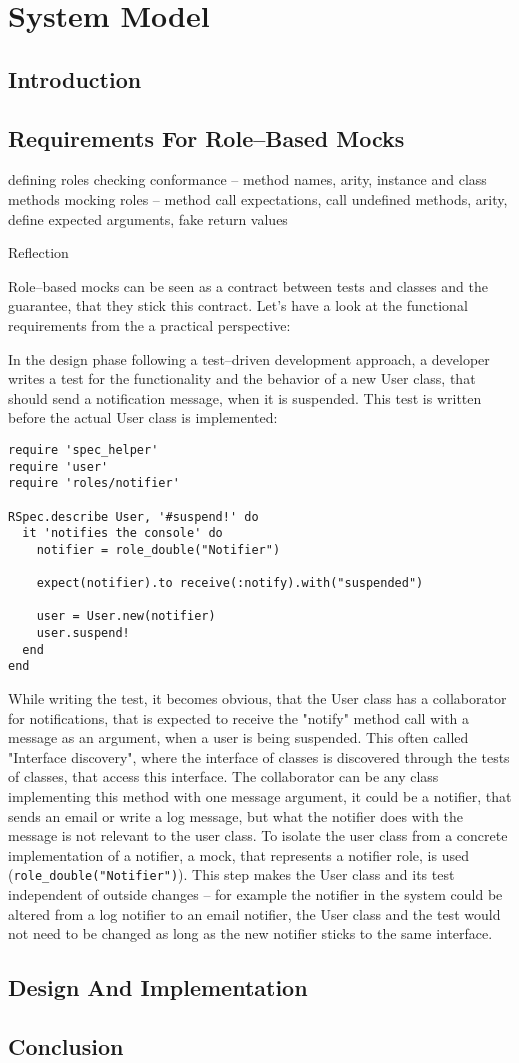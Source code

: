 \chapter{System Model}

\section{Introduction}

\section{Requirements For Role--Based Mocks}
defining roles
checking conformance – method names, arity, instance and class methods
mocking roles – method call expectations, call undefined methods, arity, define expected arguments, fake return values

Reflection

Role–based mocks can be seen as a contract between tests and classes and the guarantee, that they stick this contract. Let's have a look at the functional requirements from the a practical perspective:

In the design phase following a test–driven development approach, a developer writes a test for the functionality and the behavior of a new User class, that should send a notification message, when it is suspended. This test is written before the actual User class is implemented:

\begin{lstlisting}[caption=An example Rspec test using a double]
require 'spec_helper'
require 'user'
require 'roles/notifier'

RSpec.describe User, '#suspend!' do
  it 'notifies the console' do
    notifier = role_double("Notifier")

    expect(notifier).to receive(:notify).with("suspended")

    user = User.new(notifier)
    user.suspend!
  end
end
\end{lstlisting}

While writing the test, it becomes obvious, that the User class has a collaborator for notifications, that is expected to receive the "notify" method call with a message as an argument, when a user is being suspended. This often called "Interface discovery", where the interface of classes is discovered through the tests of classes, that access this interface. The collaborator can be any class implementing this method with one message argument, it could be a notifier, that sends an email or write a log message, but what the notifier does with the message is not relevant to the user class. To isolate the user class from a concrete implementation of a notifier, a mock, that represents a notifier role, is used (\texttt{role\_double("Notifier")}). This step makes the User class and its test independent of outside changes – for example the notifier in the system could be altered from a log notifier to an email notifier, the User class and the test would not need to be changed as long as the new notifier sticks to the same interface.


\section{Design And Implementation}

\section{Conclusion}